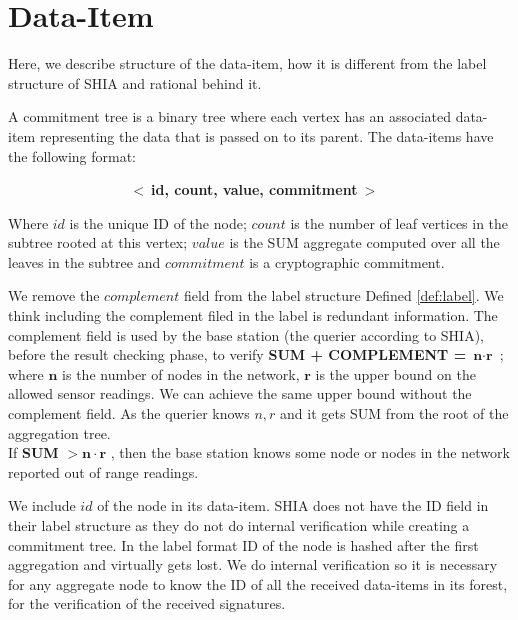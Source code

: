 \section{Data-Item}
	
	Here, we describe structure of the data-item, how it is different from the label structure of SHIA and rational behind it.	
	\begin{definition}
		\label{def:data-item}
		A commitment tree is a binary tree where each vertex has an associated data-item representing the data that is passed on to its parent. The data-items have the following format:

		$\hspace{100pt}$ \textbf{$<\ $id, count, value, commitment$\ >$}
	\end{definition}
	Where $id$ is the unique ID of the node; $count$ is the number of leaf vertices in the subtree rooted at this vertex; $value$ is the SUM aggregate computed over all the leaves in the subtree and $commitment$ is a cryptographic commitment.
	
	We remove the $complement$ field from the label structure Defined \ref{def:label}. 
	We think including the complement filed in the label is redundant information. 
	The complement field is used by the base station (the querier according to SHIA), before the result checking phase, to verify \textbf{SUM + COMPLEMENT =} $\textbf{n} \cdot \textbf{r}$ ; where $\textbf{n}$ is the number of nodes in the network, $\textbf{r}$ is the upper bound on the allowed sensor readings.
	We can achieve the same upper bound without the complement field.
	As the querier knows $n, r$ and it gets SUM from the root of the aggregation tree.\\
	If \textbf{SUM} $> \textbf{n} \cdot \textbf{r}$ , then the base station knows some node or nodes in the network reported out of range readings.

	We include $id$ of the node in its data-item.
	SHIA does not have the ID field in their label structure as they do not do internal verification while creating a commitment tree.
	In the label format ID of the node is hashed after the first aggregation and virtually gets lost.
	We do internal verification so it is necessary for any aggregate node to know the ID of all the received data-items in its forest, for the verification of the received signatures.

